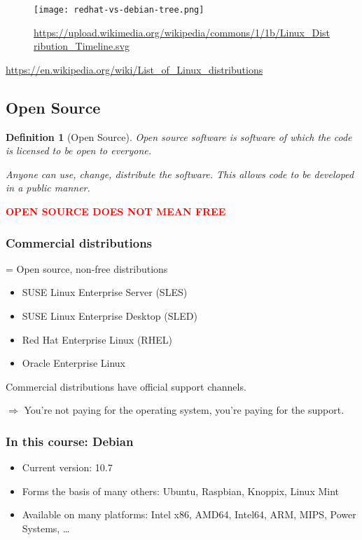 \documentclass{article}
\newtheorem{theorem}{Definition}[section]
\begin{document}
\begin{figure}[H]
    \centering
    \texttt{[image: redhat-vs-debian-tree.png]}
    \caption{\url{https://upload.wikimedia.org/wikipedia/commons/1/1b/Linux_Distribution_Timeline.svg}}
\end{figure}

\url{https://en.wikipedia.org/wiki/List_of_Linux_distributions}

\subsection{Open Source}

\begin{theorem}[Open Source]
Open source software is software of which the code is licensed to be open to everyone. 

Anyone can use, change, distribute the software. This allows code to be developed in a public manner.
\end{theorem}

\textbf{\textcolor{red}{OPEN SOURCE DOES NOT MEAN FREE}}

\subsubsection{Commercial distributions}

= Open source, non-free distributions

\begin{itemize}
    \item SUSE Linux Enterprise Server (SLES)
    \item SUSE Linux Enterprise Desktop (SLED)
    \item Red Hat Enterprise Linux (RHEL)
    \item Oracle Enterprise Linux
\end{itemize}

Commercial distributions have official support channels.

$\Rightarrow$ You're not paying for the operating system, you're paying for the support.

\subsubsection{In this course: Debian}


\begin{itemize}
    \item Current version: 10.7
    \item Forms the basis of many others: Ubuntu, Raspbian, Knoppix, Linux Mint
    \item Available on many platforms: Intel x86, AMD64, Intel64, ARM, MIPS, Power Systems, \dots
\end{itemize}
\end{document}
